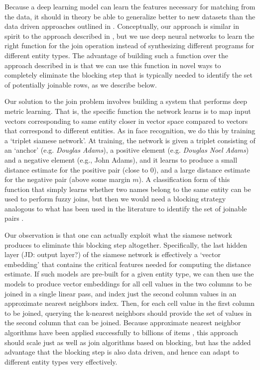 Because a deep learning model can learn the features necessary for matching from the data, it should in theory be able to generalize better to new datasets than the data driven approaches outlined in \cite{He:2015:SJS:2824032.2824036}.   Conceptually, our approach is similar in spirit to the approach described in \cite{auto-join-joining-tables-leveraging-transformations}, but we use deep neural networks to learn the right function for the join operation instead of synthesizing different programs for different entity types.  The advantage of building such a function over the approach described in \cite{auto-join-joining-tables-leveraging-transformations} is that we can use this function in novel ways to completely eliminate the blocking step that is typically needed to identify the set of potentially joinable rows, as we describe below.  

Our solution to the join problem involves building a system that performs deep metric learning.  That is, the specific function the network learns is to map input vectors corresponding to same entity closer in vector space compared to vectors that correspond to different entities.  As in face recognition, we do this by training a `triplet siamese network'.  At training, the network is given a triplet consisting of an `anchor' (e.g. \textit{Douglas Adams}), a positive element (e.g. \textit{Douglas Noel Adams}) and a negative element (e.g., John Adams), and it learns to produce a small distance estimate for the positive pair (close to 0), and a large distance estimate for the negative pair (above some margin $m$). A classification form of this function that simply learns whether two names belong to the same entity can be used to perform fuzzy joins, but then we would need a blocking strategy analogous to what has been used in the literature to identify the set of joinable pairs \cite{auto-join-joining-tables-leveraging-transformations}.  

Our observation is that one can actually exploit what the siamese network produces to eliminate this blocking step altogether.  Specifically, the last hidden layer (JD: output layer?) of the siamese network is effectively a `vector embedding' that contains the critical features needed for computing the distance estimate.  If such models are pre-built for a given entity type, we can then use the models to produce vector embeddings for all cell values in the two columns to be joined in a single linear pass, and index just the second column values in an approximate nearest neighbors index.  Then, for each cell value in the first column to be joined, querying the k-nearest neighbors should provide the set of values in the second column that can be joined.  Because approximate nearest neighbor algorithms have been applied successfully to billions of items \cite{JDH17}, this approach should scale just as well as join algorithms based on blocking, but has the added advantage that the blocking step is also data driven, and hence can adapt to different entity types very effectively.

